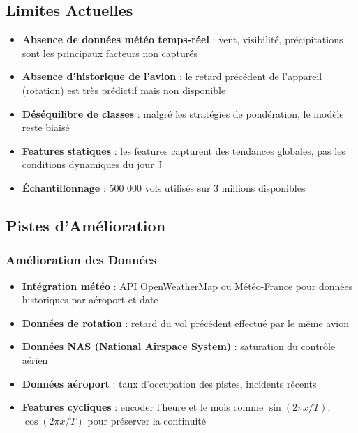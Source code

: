 \documentclass[12pt,a4paper]{article}
\begin{document}
\subsection{Limites Actuelles}

\begin{warningbox}
  \begin{itemize}[leftmargin=*, nosep]
    \item \textbf{Absence de données météo temps-réel} : vent, visibilité, précipitations sont 
          les principaux facteurs non capturés
    \item \textbf{Absence d'historique de l'avion} : le retard précédent de l'appareil 
          (rotation) est très prédictif mais non disponible
    \item \textbf{Déséquilibre de classes} : malgré les stratégies de pondération, 
          le modèle reste biaisé
    \item \textbf{Features statiques} : les features capturent des tendances globales, 
          pas les conditions dynamiques du jour J
    \item \textbf{Échantillonnage} : 500 000 vols utilisés sur 3 millions disponibles
  \end{itemize}
\end{warningbox}

\subsection{Pistes d'Amélioration}

\subsubsection{Amélioration des Données}

\begin{itemize}[leftmargin=*]
  \item \textbf{Intégration météo} : API OpenWeatherMap ou Météo-France pour données 
        historiques par aéroport et date
  \item \textbf{Données de rotation} : retard du vol précédent effectué par le même avion
  \item \textbf{Données NAS (National Airspace System)} : saturation du contrôle aérien
  \item \textbf{Données aéroport} : taux d'occupation des pistes, incidents récents
  \item \textbf{Features cycliques} : encoder l'heure et le mois comme $\sin(2\pi x / T)$, 
        $\cos(2\pi x / T)$ pour préserver la continuité
\end{itemize}
\end{document}
